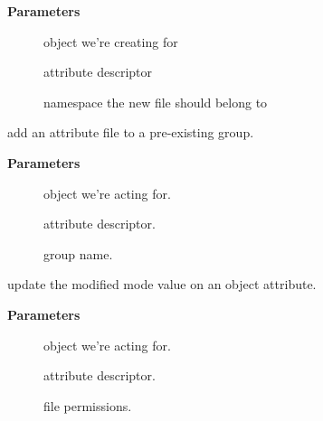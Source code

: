 \documentclass[a4paper,8pt,english]{sphinxmanual}
\begin{document}
\textbf{Parameters}
\begin{description}
\item[{}] \leavevmode
object we're creating for

\item[{}] \leavevmode
attribute descriptor

\item[{}] \leavevmode
namespace the new file should belong to

\end{description}

\begin{fulllineitems}
\label{filesystems/index:c.sysfs_add_file_to_group}
add an attribute file to a pre-existing group.

\end{fulllineitems}


\textbf{Parameters}
\begin{description}
\item[{}] \leavevmode
object we're acting for.

\item[{}] \leavevmode
attribute descriptor.

\item[{}] \leavevmode
group name.

\end{description}

\begin{fulllineitems}
\label{filesystems/index:c.sysfs_chmod_file}
update the modified mode value on an object attribute.

\end{fulllineitems}


\textbf{Parameters}
\begin{description}
\item[{}] \leavevmode
object we're acting for.

\item[{}] \leavevmode
attribute descriptor.

\item[{}] \leavevmode
file permissions.

\end{description}
\end{document}
